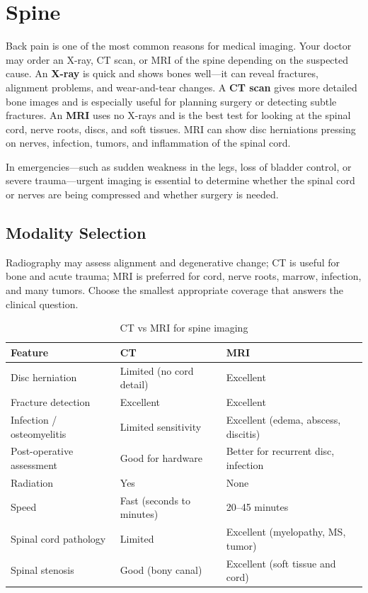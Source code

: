 \chapter{Spine}

\label{ch:ch40_spine}

Back pain is one of the most common reasons for medical imaging. Your doctor may order an X-ray, CT scan, or MRI of the spine depending on the suspected cause. An \textbf{X-ray} is quick and shows bones well---it can reveal fractures, alignment problems, and wear-and-tear changes. A \textbf{CT scan} gives more detailed bone images and is especially useful for planning surgery or detecting subtle fractures. An \textbf{MRI} uses no X-rays and is the best test for looking at the spinal cord, nerve roots, discs, and soft tissues. MRI can show disc herniations pressing on nerves, infection, tumors, and inflammation of the spinal cord.

In emergencies---such as sudden weakness in the legs, loss of bladder control, or severe trauma---urgent imaging is essential to determine whether the spinal cord or nerves are being compressed and whether surgery is needed.


\section{Modality Selection}
Radiography may assess alignment and degenerative change; CT is useful for bone and acute trauma; MRI is preferred for cord, nerve roots, marrow, infection, and many tumors. Choose the smallest appropriate coverage that answers the clinical question.

\begin{table}[h]
\centering
\caption{CT vs MRI for spine imaging}
\begin{tabular}{p{3.5cm} p{5.5cm} p{5.5cm}}
\hline
\textbf{Feature} & \textbf{CT} & \textbf{MRI} \\
\hline
Disc herniation & Limited (no cord detail) & Excellent \\
Fracture detection & Excellent & Excellent \\
Infection / osteomyelitis & Limited sensitivity & Excellent (edema, abscess, discitis) \\
Post-operative assessment & Good for hardware & Better for recurrent disc, infection \\
Radiation & Yes & None \\
Speed & Fast (seconds to minutes) & 20--45 minutes \\
Spinal cord pathology & Limited & Excellent (myelopathy, MS, tumor) \\
Spinal stenosis & Good (bony canal) & Excellent (soft tissue and cord) \\
\hline
\end{tabular}
\end{table}

